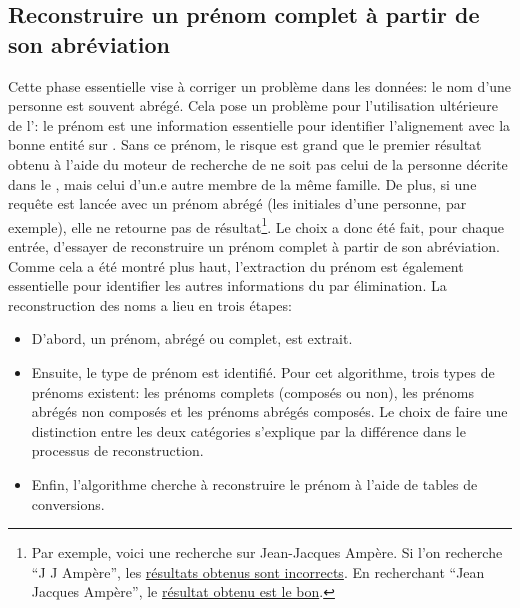 \subsection{Reconstruire un prénom complet à partir de son abréviation}
Cette phase essentielle vise à corriger un problème dans les données: le nom d'une personne est souvent abrégé. Cela pose un problème pour l'utilisation ultérieure de l'\api{}: le prénom est une information essentielle pour identifier l'alignement avec la bonne entité sur \wkd{}. Sans ce prénom, le risque est grand que le premier résultat obtenu à l'aide du moteur de recherche de \wkd{} ne soit pas celui de la personne décrite dans le \tname{}, mais celui d'un.e autre membre de la même famille. De plus, si une requête est lancée avec un prénom abrégé (les initiales d'une personne, par exemple), elle ne retourne pas de résultat\footnote{Par exemple, voici une recherche sur Jean-Jacques Ampère. Si l'on recherche \enquote{J J Ampère}, les \href{https://www.wikidata.org/w/index.php?search=j+j+amp\%C3\%A8re}{résultats obtenus sont incorrects}. En recherchant \enquote{Jean Jacques Ampère}, le \href{https://www.wikidata.org/w/index.php?search=jean+jacques+amp\%C3\%A8re}{résultat obtenu est le bon}.}. Le choix a donc été fait, pour chaque entrée, d'essayer de reconstruire un prénom complet à partir de son abréviation. Comme cela a été montré plus haut, l'extraction du prénom est également essentielle pour identifier les autres informations du \tname{} par élimination. La reconstruction des noms a lieu en trois étapes: 
\begin{itemize}
	\item D'abord, un prénom, abrégé ou complet, est extrait.
	\item Ensuite, le type de prénom est identifié. Pour cet algorithme, trois types de prénoms existent: les prénoms complets (composés ou non), les prénoms abrégés non composés et les prénoms abrégés composés. Le choix de faire une distinction entre les deux catégories s'explique par la différence dans le processus de reconstruction.
	\item Enfin, l'algorithme cherche à reconstruire le prénom à l'aide de tables de conversions.
\end{itemize}

